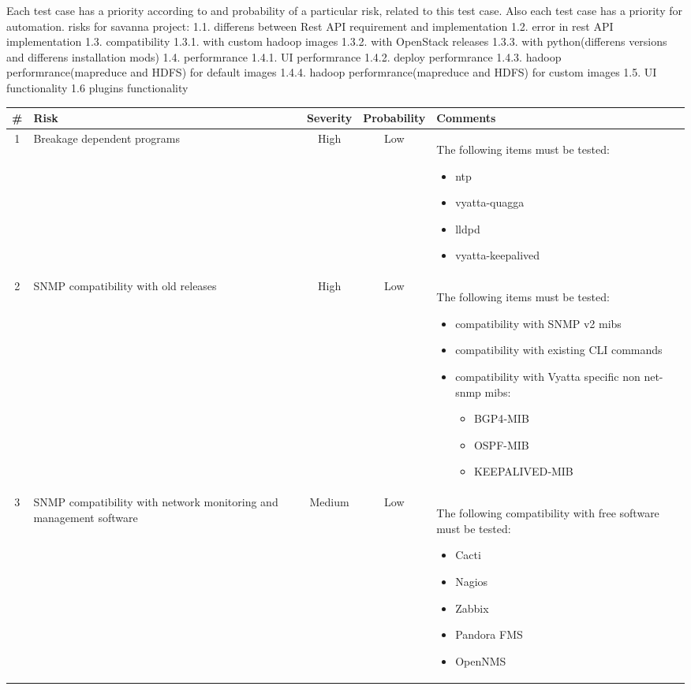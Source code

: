 \documentclass[a4paper,11pt]{article}
\begin{document}
Each test case has a priority according to and probability of a particular risk, related to this test case. Also each test case has a priority for automation.
risks for savanna project:
1.1. differens between Rest API requirement and implementation
1.2. error in rest API implementation 
1.3. compatibility
1.3.1. with custom hadoop images
1.3.2. with OpenStack releases
1.3.3. with python(differens versions and differens installation mods)
1.4. performrance
1.4.1. UI performrance
1.4.2. deploy performrance
1.4.3. hadoop performrance(mapreduce and HDFS) for default images
1.4.4. hadoop performrance(mapreduce and HDFS) for custom images
1.5. UI functionality
1.6 plugins functionality 
\newpage
\begin{longtable}{|c|p{3cm}|c|c|p{8cm}|}
\hline
\# & {\bf Risk} & {\bf Severity} & {\bf Probability} & {\bf Comments}\\
\hline
1&Breakage dependent programs& High & Low & The following items must be tested: 
\begin{itemize}
\item ntp
\item vyatta-quagga
\item lldpd 
\item vyatta-keepalived 
\end{itemize}
\\ \hline
2&SNMP compatibility with old releases & High & Low & The following items must be tested:
\begin{itemize}
\item compatibility with SNMP v2 mibs
\item compatibility with existing CLI commands
\item compatibility with Vyatta specific non net-snmp mibs:
\begin{itemize}
\item BGP4‐MIB
\item OSPF-MIB
\item KEEPALIVED‐MIB 	
\end{itemize}
\end{itemize}
\\ \hline
3&SNMP compatibility with network monitoring and management software & Medium & Low &  The following compatibility with free software must be tested:
\begin{itemize}
\item Cacti
\item Nagios
\item Zabbix 
\item Pandora FMS
\item OpenNMS

\end{itemize}
\end{longtable}
\end{document}
